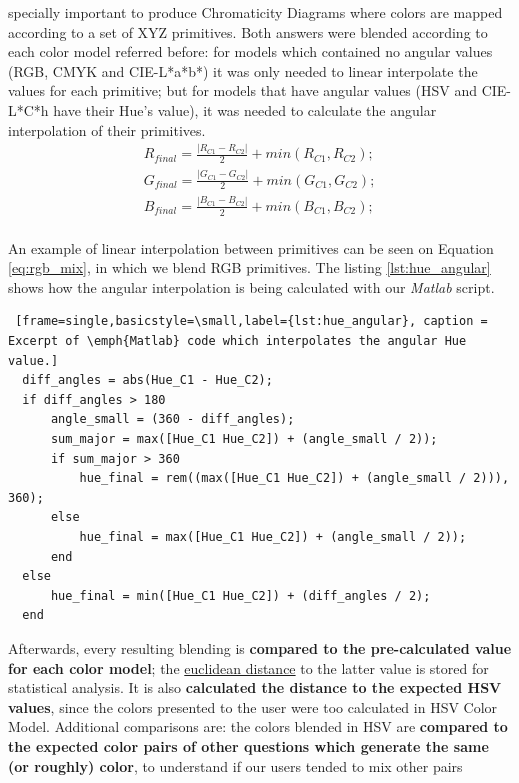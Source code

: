 specially important to produce Chromaticity Diagrams where colors are mapped according to a set of XYZ primitives. Both answers were blended according to each color model referred before:
for models which contained no angular values (RGB, CMYK and CIE-L*a*b*) it was only needed to linear interpolate the values for each primitive; but for models that have angular values (HSV and CIE-L*C*h have their Hue's value), it was
needed to calculate the angular interpolation of their primitives.
%
\begin{equation}
  \label{eq:rgb_mix}
  \begin{aligned}
    R_{final} = \frac{|R_{C1} - R_{C2}|}{2} + min(R_{C1}, R_{C2}); \\
    G_{final} = \frac{|G_{C1} - G_{C2}|}{2} + min(G_{C1}, G_{C2}); \\
    B_{final} = \frac{|B_{C1} - B_{C2}|}{2} + min(B_{C1}, B_{C2}); \\
  \end{aligned}
\end{equation} \par
%
An example of linear interpolation between primitives can be seen on Equation \ref{eq:rgb_mix}, in which we blend \gls{RGB} primitives. The listing \ref{lst:hue_angular} shows
how the angular interpolation is being calculated with our \emph{Matlab} script.
%
\begin{lstlisting} [frame=single,basicstyle=\small,label={lst:hue_angular}, caption = Excerpt of \emph{Matlab} code which interpolates the angular Hue value.]
  diff_angles = abs(Hue_C1 - Hue_C2);
  if diff_angles > 180
      angle_small = (360 - diff_angles);
      sum_major = max([Hue_C1 Hue_C2]) + (angle_small / 2));
      if sum_major > 360
          hue_final = rem((max([Hue_C1 Hue_C2]) + (angle_small / 2))), 360);
      else
          hue_final = max([Hue_C1 Hue_C2]) + (angle_small / 2));
      end
  else
      hue_final = min([Hue_C1 Hue_C2]) + (diff_angles / 2);
  end
\end{lstlisting} \par
%
Afterwards, every resulting blending is \textbf{compared to the pre-calculated value for each color model}; the \ul{euclidean distance} to the latter value is stored for statistical analysis. It is
also \textbf{calculated the distance to the expected HSV values}, since the colors presented to the user were too calculated in HSV Color Model. Additional comparisons are: the colors
blended in HSV are \textbf{compared to the expected color pairs of other questions which generate the same (or roughly) color}, to understand if our users tended to mix other pairs
